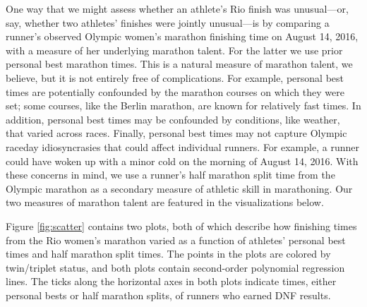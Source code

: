 \documentclass[12pt,titlepage]{article}
\begin{document}
One way that we might assess whether an athlete's Rio finish was
unusual---or, say, whether two athletes' finishes were jointly
unusual---is by comparing a runner's observed Olympic women's marathon
finishing time on August 14, 2016, with a measure of her underlying
marathon talent.  For the latter we use prior personal best marathon
times.  This is a natural measure of marathon talent, we believe, but
it is not entirely free of complications.  For example, personal best
times are potentially confounded by the marathon courses on which they
were set; some courses, like the Berlin marathon, are known for
relatively fast times.  In addition, personal best times may be
confounded by conditions, like weather, that varied across races.
Finally, personal best times may not capture Olympic raceday
idiosyncrasies that could affect individual runners.  For example, a
runner could have woken up with a minor cold on the morning of August
14, 2016.  With these concerns in mind, we use a runner's half
marathon split time from the Olympic marathon as a secondary measure
of athletic skill in marathoning.  Our two measures of marathon talent
are featured in the visualizations below.

Figure \ref{fig:scatter} contains two plots, both of which describe
how finishing times from the Rio women's marathon varied as a function
of athletes' personal best times and half marathon split times.  The
points in the plots are colored by twin/triplet status, and both plots
contain second-order polynomial regression lines.  The ticks along the
horizontal axes in both plots indicate times, either personal bests or
half marathon splits, of runners who earned DNF results.
\end{document}
